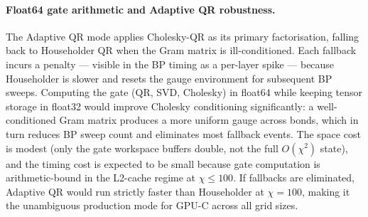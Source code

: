 \paragraph{Float64 gate arithmetic and Adaptive QR robustness.}
The Adaptive QR mode applies Cholesky-QR as its primary factorisation,
falling back to Householder QR when the Gram matrix is ill-conditioned.
Each fallback incurs a penalty --- visible in the BP timing as a
per-layer spike --- because Householder is slower and resets the gauge
environment for subsequent BP sweeps.
Computing the gate (QR, SVD, Cholesky) in float64 while keeping tensor
storage in float32 would improve Cholesky conditioning significantly:
a well-conditioned Gram matrix produces a more uniform gauge across bonds,
which in turn reduces BP sweep count and eliminates most fallback events.
The space cost is modest (only the gate workspace buffers double, not the
full $O(\chi^2)$ state), and the timing cost is expected to be small
because gate computation is arithmetic-bound in the L2-cache regime
at $\chi \leq 100$.
If fallbacks are eliminated, Adaptive QR would run strictly faster than
Householder at $\chi=100$, making it the unambiguous production mode for
GPU-C across all grid sizes.

